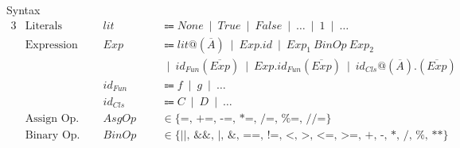 \documentclass[11pt]{jarticle}
\begin{document}
Syntax
\begin{alignat*}{3} %
  &\text{Literals} &&lit &&\Coloneqq None ~\mid~ True ~\mid~ False ~\mid~  \dots ~\mid~ 1 ~\mid~ \dots\\
  &\text{Expression}~~~ &&Exp &&\Coloneqq lit@(\overline{A}) ~\mid~ Exp.id ~\mid~ Exp_1 ~ BinOp ~ Exp_2 \\
  &&&&&~\mid~ id_{Fun}(\overline{Exp}) ~\mid~ Exp.id_{Fun}(\overline{Exp}) ~\mid~ id_{Cls}@(\overline{A}).(\overline{Exp})\\
  &&&id_{Fun} &&\Coloneqq f ~\mid~ g ~\mid~ \dots\\
  &&&id_{Cls} &&\Coloneqq C ~\mid~ D ~\mid~ \dots\\
  &\text{Assign Op.} &&AsgOp~~~ &&\in \{\texttt{=, +=, -=, *=, /=, \%=, //=}\}\\
  &\text{Binary Op.} &&BinOp &&\in \{\texttt{||, \&\&, |, \&, ==, !=, <, >, <=, >=, +, -, *, /, \%, **}\}
\end{alignat*}
\end{document}
